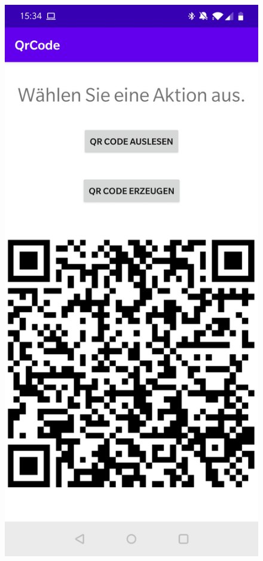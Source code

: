\documentclass[12pt,					%
							 oneside,			%
							 a4paper,			%
							 halfparskip,		%
							 liststotoc,			%
							 bibtotoc,			%
							 fleqn,				%
							 pointlessnumbers]	%
							 {scrreprt}
\begin{document}
\begin{figure}[ht]
\centering
   \begin{minipage}[b]{.4\linewidth} %
	\centering
	 \includegraphics[scale=0.1]{pictures/MAIN} 

\end{minipage}
\end{figure}
\end{document}
